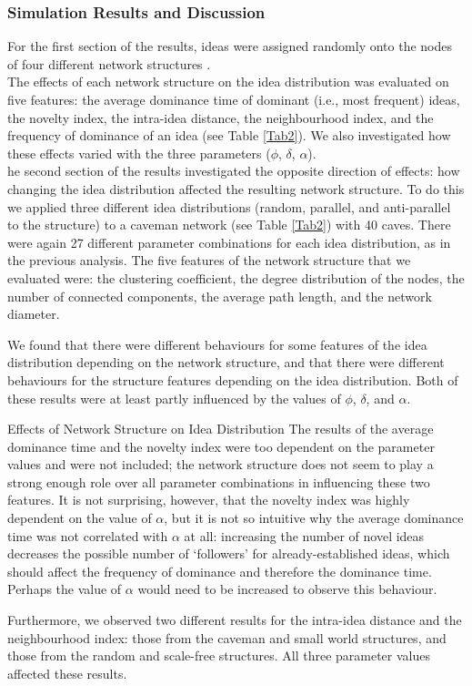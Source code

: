 \documentclass{beamer}
\begin{document}
\begin{frame}
\frametitle{Simulation Results and Discussion}
For the first section of the results, ideas were assigned randomly onto the nodes of four different network structures .\\
The effects of each network structure on the idea distribution was evaluated on five features: the average dominance time of dominant (i.e., most frequent) ideas, the novelty index, the intra-idea distance, the neighbourhood index, and the frequency of dominance of an idea (see Table \ref{Tab2}). We also investigated how these effects varied with the three parameters ($\phi$, $\delta$, $\alpha$).\\
he second section of the results investigated the opposite direction of effects: how changing the idea distribution affected the resulting network structure. To do this we applied three different idea distributions (random, parallel, and anti-parallel to the structure) to a caveman network (see Table \ref{Tab2}) with 40 caves. There were again 27 different parameter combinations for each idea distribution, as in the previous analysis. The five features of the network structure that we evaluated were: the clustering coefficient, the degree distribution of the nodes, the number of connected components, the average path length, and the network diameter. 

We found that there were different behaviours for some features of the idea distribution depending on the network structure, and that there were different behaviours for the structure features depending on the idea distribution. Both of these results were at least partly influenced by the values of $\phi$, $\delta$, and $\alpha$.
\end{frame}
%
\begin{frame}
{Effects of Network Structure on Idea Distribution}
The results of the average dominance time and the novelty index were too dependent on the parameter values and were not included; the network structure does not seem to play a strong enough role over all parameter combinations in influencing these two features. It is not surprising, however, that the novelty index was highly dependent on the value of $\alpha$, but it is not so intuitive why the average dominance time was not correlated with $\alpha$ at all: increasing the number of novel ideas decreases the possible number of `followers' for already-established ideas, which should affect the frequency of dominance and therefore the dominance time. Perhaps the value of $\alpha$ would need to be increased to observe this behaviour.

Furthermore, we observed two different results for the intra-idea distance and the neighbourhood index: those from the caveman and small world structures, and those from the random and scale-free structures. All three parameter values affected these results. 
\end{frame}
\end{document}
